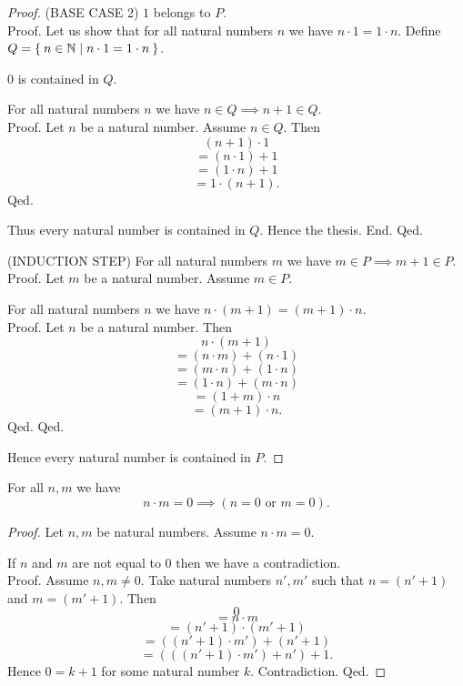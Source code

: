 \documentclass[../../natural-numbers.ftl.tex]{subfiles}
\begin{document}
\begin{forthel}
\begin{proof}
      (BASE CASE 2) $1$ belongs to $P$. \\
      Proof.
        Let us show that for all natural numbers $n$ we have $n \cdot 1 = 1 \cdot n$.
          Define $Q = \Set{n \in \mathbb{N} | n \cdot 1 = 1 \cdot n}$.

          $0$ is contained in $Q$.

          For all natural numbers $n$ we have $n \in Q \implies n + 1 \in Q$. \\
          Proof.
            Let $n$ be a natural number.
            Assume $n \in Q$.
            Then
            \[   (n + 1) \cdot 1 \]
            \[ = (n \cdot 1) + 1 \]   %
            \[ = (1 \cdot n) + 1 \]   %
            \[ = 1 \cdot (n + 1). \]  %
          Qed.

          Thus every natural number is contained in $Q$.
          Hence the thesis.
        End.
      Qed.

      (INDUCTION STEP) For all natural numbers $m$ we have $m \in P \implies m + 1 \in P$. \\
      Proof.
        Let $m$ be a natural number.
        Assume $m \in P$.

        For all natural numbers $n$ we have $n \cdot (m + 1) = (m + 1) \cdot n$. \\
        Proof.
          Let $n$ be a natural number.
          Then
          \[ n \cdot (m + 1) \]
          \[ = (n \cdot m) + (n \cdot 1) \]
          \[ = (m \cdot n) + (1 \cdot n) \]
          \[ = (1 \cdot n) + (m \cdot n) \]
          \[ = (1 + m) \cdot n \]
          \[ = (m + 1) \cdot n. \]
        Qed.
      Qed.

      Hence every natural number is contained in $P$.
    \end{proof}


    \begin{proposition}\label{Arithmetic_01_03_692941}
      For all $n,m$ we have \[ n \cdot m = 0 \implies (\text{$n = 0$ or $m = 0$}). \]
    \end{proposition}
    \begin{proof}
      Let $n,m$ be natural numbers.
      Assume $n \cdot m = 0$.

      If $n$ and $m$ are not equal to $0$ then we have a contradiction. \\
      Proof.
        Assume $n,m \neq 0$.
        Take natural numbers $n',m'$ such that $n = (n' + 1)$ and $m = (m' + 1)$.
        Then
        \[   0 \]
        \[ = n \cdot m \]
        \[ = (n' + 1) \cdot (m' + 1) \]
        \[ = ((n' + 1) \cdot m') + (n' + 1) \]
        \[ = (((n' + 1) \cdot m') + n') + 1. \]
        Hence $0 = k + 1$ for some natural number $k$.
        Contradiction.
      Qed.


\end{proof}
\end{forthel}
\end{document}
